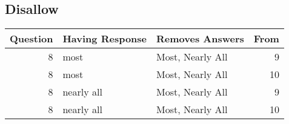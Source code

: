 \documentclass[10pt,twocolumn]{article}
\begin{document}
\subsection*{Disallow}
\label{sec:org54323c8}

\begin{center}
\begin{tabular}{rllr}
Question & Having Response & Removes Answers & From\\
\hline
8 & most & Most, Nearly All & 9\\
8 & most & Most, Nearly All & 10\\
8 & nearly all & Most, Nearly All & 9\\
8 & nearly all & Most, Nearly All & 10\\
\end{tabular}
\end{center}
\end{document}
